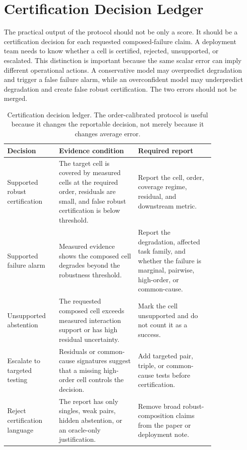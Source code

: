 \documentclass{article}
\begin{document}
\section{Certification Decision Ledger}

The practical output of the protocol should not be only a score. It should be a certification decision for each requested composed-failure claim. A deployment team needs to know whether a cell is certified, rejected, unsupported, or escalated. This distinction is important because the same scalar error can imply different operational actions. A conservative model may overpredict degradation and trigger a false failure alarm, while an overconfident model may underpredict degradation and create false robust certification. The two errors should not be merged.

\begin{table}[H]
\centering
\small
\begin{tabular}{p{0.20\linewidth}p{0.33\linewidth}p{0.32\linewidth}}
\toprule
Decision & Evidence condition & Required report \\
\midrule
Supported robust certification & The target cell is covered by measured cells at the required order, residuals are small, and false robust certification is below threshold. & Report the cell, order, coverage regime, residual, and downstream metric. \\
Supported failure alarm & Measured evidence shows the composed cell degrades beyond the robustness threshold. & Report the degradation, affected task family, and whether the failure is marginal, pairwise, high-order, or common-cause. \\
Unsupported abstention & The requested composed cell exceeds measured interaction support or has high residual uncertainty. & Mark the cell unsupported and do not count it as a success. \\
Escalate to targeted testing & Residuals or common-cause signatures suggest that a missing high-order cell controls the decision. & Add targeted pair, triple, or common-cause tests before certification. \\
Reject certification language & The report has only singles, weak pairs, hidden abstention, or an oracle-only justification. & Remove broad robust-composition claims from the paper or deployment note. \\
\bottomrule
\end{tabular}
\caption{Certification decision ledger. The order-calibrated protocol is useful because it changes the reportable decision, not merely because it changes average error.}
\label{tab:decision_ledger}
\end{table}
\end{document}
